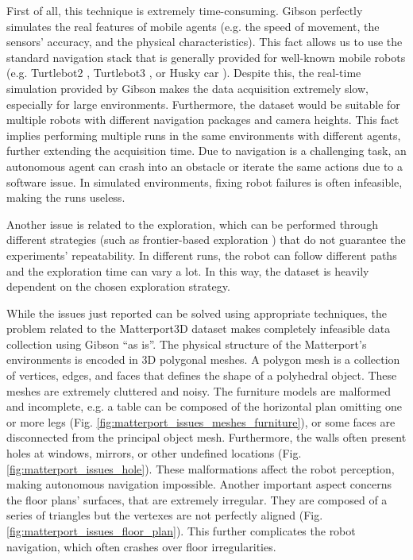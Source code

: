 First of all, this technique is extremely time-consuming. Gibson perfectly simulates the real features of mobile agents (e.g. the speed of movement, the sensors' accuracy, and the physical characteristics). This fact allows us to use the standard navigation stack that is generally provided for well-known mobile robots (e.g. Turtlebot2 \cite{turtlebot2}, Turtlebot3 \cite{turtlebot3}, or Husky car \cite{husky}). Despite this, the real-time simulation provided by Gibson makes the data acquisition extremely slow, especially for large environments.  Furthermore, the dataset would be suitable for multiple robots with different navigation packages and camera heights. This fact implies performing multiple runs in the same environments with different agents, further extending the acquisition time. Due to navigation is a challenging task, an autonomous agent can crash into an obstacle or iterate the same actions due to a software issue. In simulated environments, fixing robot failures is often infeasible, making the runs useless. 

Another issue is related to the exploration, which can be performed through different strategies (such as frontier-based exploration \cite{frontierexploration}) that do not guarantee the experiments' repeatability. In different runs, the robot can follow different paths and the exploration time can vary a lot. In this way, the dataset is heavily dependent on the chosen exploration strategy.

While the issues just reported can be solved using appropriate techniques, the problem related to the Matterport3D dataset makes completely infeasible data collection using Gibson ``as is''. The physical structure of the Matterport's environments is encoded in 3D polygonal meshes. A polygon mesh is a collection of vertices, edges, and faces that defines the shape of a polyhedral object. These meshes are extremely cluttered and noisy. The furniture models are malformed and incomplete, e.g. a table can be composed of the horizontal plan omitting one or more legs (Fig. \ref{fig:matterport_issues_meshes_furniture}), or some faces are disconnected from the principal object mesh. Furthermore, the walls often present holes at windows, mirrors, or other undefined locations (Fig. \ref{fig:matterport_issues_hole}). These malformations affect the robot perception, making autonomous navigation impossible. Another important aspect concerns the floor plans' surfaces, that are extremely irregular. They are composed of a series of triangles but the vertexes are not perfectly aligned (Fig. \ref{fig:matterport_issues_floor_plan}). This further complicates the robot navigation, which often crashes over floor irregularities.

